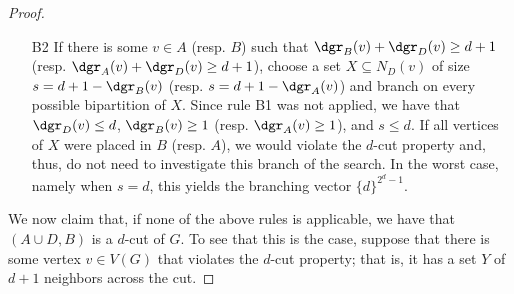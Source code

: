 \documentclass[a4paper,UKenglish,cleveref, autoref]{lipics-v2019}
\begin{document}
\begin{proof}
\begin{itemize}


        \item[B2] If there is some $v \in A$ (resp. $B$) such that $\dgr_B(v) + \dgr_D(v) \geq d+1$ (resp. $\dgr_A(v) + \dgr_D(v) \geq d+1$), choose a set $X \subseteq N_D(v)$ of size $s = d+1 - \dgr_B(v)$ (resp. $s = d+1 - \dgr_A(v)$) and branch on every possible bipartition of $X$.
        Since rule B1 was not applied, we have that $\dgr_D(v) \leq d$, $\dgr_B(v) \geq 1$ (resp. $\dgr_A(v) \geq 1$), and $s \leq d$.
        If all vertices of $X$ were placed in $B$ (resp. $A$), we would violate the $d$-cut property and, thus, do not need to investigate this branch of the search.
        In the worst case, namely when $s = d$, this yields the branching vector $\{d\}^{2^d-1}$.
    \end{itemize}

    We now claim that, if none of the above rules is applicable, we have that $(A \cup D, B)$ is a $d$-cut of $G$.
    To see that this is the case, suppose that there is some vertex $v \in V(G)$ that violates the $d$-cut property; that is, it has a set $Y$ of $d+1$ neighbors across the cut.


\end{proof}
\end{document}
